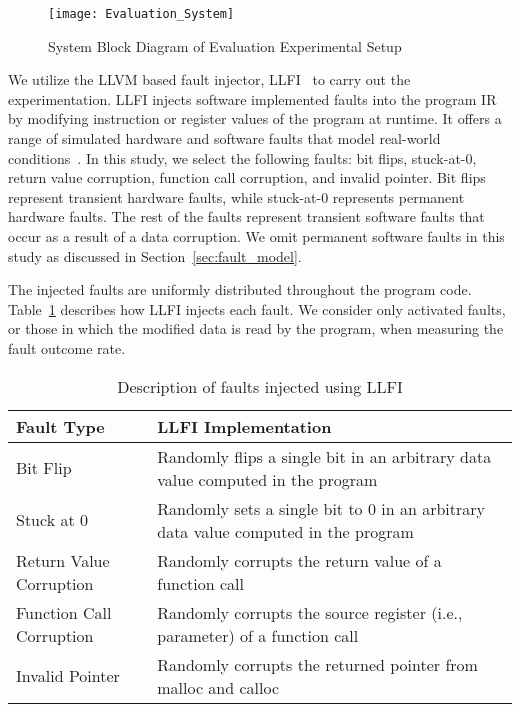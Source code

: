 \begin{figure}[htbp]
  \centering
  \texttt{[image: Evaluation\_System]}
  \caption{System Block Diagram of Evaluation Experimental Setup}
  \label{fig:evaluation_sys}
\end{figure}


We utilize the LLVM based fault injector, LLFI~\cite{LLFI} to carry out the experimentation.
LLFI injects software implemented faults into the program IR by modifying instruction or register values of the program at runtime.
It offers a range of simulated hardware and software faults that model real-world conditions~\cite{V2005}.
In this study, we select the following faults: bit flips, stuck-at-0, return value corruption, function call corruption, and invalid pointer.
Bit flips represent transient hardware faults, while stuck-at-0 represents permanent hardware faults. 
The rest of the faults represent transient software faults that occur as a result of a data corruption.
We omit permanent software faults in this study as discussed in Section~\ref{sec:fault_model}.

The injected faults are uniformly distributed throughout the program code.
Table~\ref{tab:faulttypes} describes how LLFI injects each fault.
We consider only activated faults, or those in which the modified data is read by the program, when measuring the fault outcome rate.


\begin{table}[htbp]
\small{
\begin{center}
    \begin{tabular}{|p{3cm}|p{5cm}|}
    \hline
    \textbf{Fault Type} & \textbf{LLFI Implementation} \\ \hline
    Bit Flip & Randomly flips a single bit in an arbitrary data value computed in the program  \\ \hline
    Stuck at 0 & Randomly sets a single bit to 0 in an arbitrary data value computed in the program  \\ \hline
    Return Value Corruption & Randomly corrupts the return value of a function call \\ \hline
    Function Call Corruption & Randomly corrupts the source register (i.e., parameter) of a function call \\ \hline
    Invalid Pointer & Randomly corrupts the returned pointer from malloc and calloc\\ \hline
    \hline
    \end{tabular}
    \end{center}
    }
    \caption{Description of faults injected using LLFI}
    \label{tab:faulttypes}
\end{table}
 

